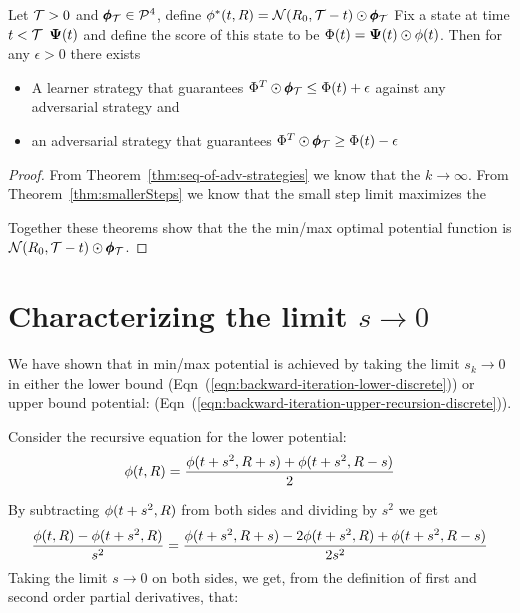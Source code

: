 \documentclass[anon,12pt]{colt2024} %
\begin{document}
\begin{theorem} \label{thm:min-max-limit}
Let $\mathcal{T}>0$ and $\pmb{\phi}_{\mathcal{T}} \in {\cal P}^{4}$, define $\phi^*(t,R) = {\cal N}(R_0,\mathcal{T}-t) \odot \pmb{\phi}_{\mathcal{T}}$
Fix a state at time $t<\mathcal{T}$ ${\bf \Psi}(t)$ and define the score of this state
to be $\Phi(t) = {\bf \Psi}(t) \odot \phi(t)$. Then for any $\epsilon>0$ there exists
\begin{itemize}
\item A learner strategy that guarantees $\Phi^T \odot \pmb{\phi}_{\mathcal{T}} \leq \Phi(t)+\epsilon$ against any adversarial strategy and
  \item an adversarial strategy that guarantees  $\Phi^T \odot \pmb{\phi}_{\mathcal{T}} \geq \Phi(t)-\epsilon$
\end{itemize}
\end{theorem}
\begin{proof}
From Theorem~\ref{thm:seq-of-adv-strategies} we know that the  $k \to \infty$.
From Theorem~\ref{thm:smallerSteps} we know that the small step limit maximizes the 

Together these theorems show that the the min/max optimal potential function is $ {\cal N}(R_0,\mathcal{T}-t) \odot \pmb{\phi}_{\mathcal{T}}$.
\end{proof}

\section{Characterizing the limit $s \to 0$}
\label{sec:continuous}

We have shown that in min/max potential is achieved by taking the
limit $s_k \to 0$ in either the lower bound
(Eqn~(\ref{eqn:backward-iteration-lower-discrete})) or upper bound
potential:
(Eqn~(\ref{eqn:backward-iteration-upper-recursion-discrete})).

Consider the recursive equation for the lower potential:
 \begin{equation}
   \phi(t, R) =  \frac{\phi(t+s^2,R+s) + \phi(t+s^2,R-s)}{2}
 \end{equation}

 By subtracting $\phi(t+s^2,R)$ from both sides and dividing by $s^2$ we get 
 \begin{equation}
   \frac{\phi(t, R)  - \phi(t+s^2,R)}{s^2} =  \frac{\phi(t+s^2,R+s) - 2\phi(t+s^2,R)+\phi(t+s^2,R-s)}{2s^2} \label{eqn:difference}
 \end{equation}
 Taking the limit $s \to 0$ on both sides, we get, from the definition of first and second order partial derivatives, that:
\end{document}
